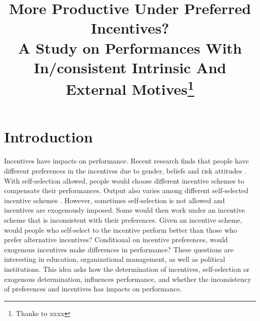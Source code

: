 \documentclass[12pt]{article}
\title{More Productive Under Preferred Incentives? \\ A Study on Performances With In/consistent Intrinsic And External Motives\footnote{Thanks to xxxx}}
\begin{document}
\maketitle
\section{Introduction}
Incentives have impacts on performance. Recent research finds that people have different preferences in the incentives due to gender, beliefs and risk attitudes \citep{Niederle2007, Apicella2017}. With self-selection allowed, people would choose different incentive schemes to compensate their performances. Output also varies among different self-selected incentive schemes \citep{Dohmen2011a}. However, sometimes self-selection is not allowed and incentives are exogenously imposed. Some would then work under an incentive scheme that is inconsistent with their preferences. Given an incentive scheme, would people who self-select to the incentive perform better than those who prefer alternative incentives? Conditional on incentive preferences, would exogenous incentives make differences in performance? These questions are interesting in education, organizational management, as well as political institutions. This idea asks how the determination of incentives, self-selection or exogenous determination, influences performance, and whether the inconsistency of preferences and incentives has impacts on performance. 


\end{document}
